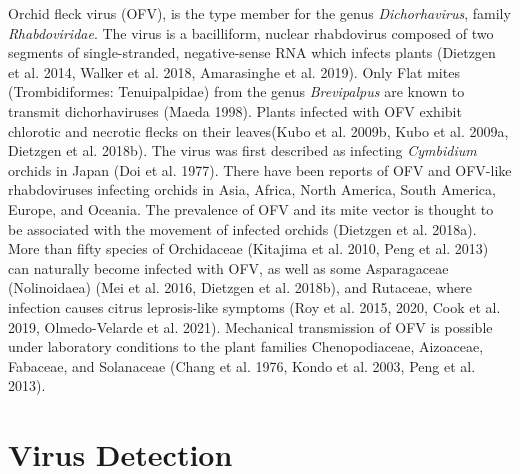 \documentclass[12pt,final,CPage]{ufthesis}
\begin{document}
{  Orchid fleck virus (OFV), is the type member for the genus \emph{Dichorhavirus}, family \emph{Rhabdoviridae}. The virus is a bacilliform, nuclear rhabdovirus composed of two segments of single-stranded, negative-sense RNA which infects plants (Dietzgen et al. 2014, Walker et al. 2018, Amarasinghe et al. 2019). Only Flat mites (Trombidiformes: Tenuipalpidae) from the genus \emph{Brevipalpus} are known to transmit dichorhaviruses (Maeda 1998). Plants infected with OFV exhibit chlorotic and necrotic flecks on their leaves(Kubo et al. 2009b, Kubo et al. 2009a, Dietzgen et al. 2018b). The virus was first described as infecting \emph{Cymbidium} orchids in Japan (Doi et al. 1977). There have been reports of OFV and OFV-like rhabdoviruses infecting orchids in Asia, Africa, North America, South America, Europe, and Oceania. The prevalence of OFV and its mite vector is thought to be associated with the movement of infected orchids (Dietzgen et al. 2018a). More than fifty species of Orchidaceae (Kitajima et al. 2010, Peng et al. 2013) can naturally become infected with OFV, as well as some Asparagaceae (Nolinoidaea) (Mei et al. 2016, Dietzgen et al. 2018b), and Rutaceae, where infection causes citrus leprosis-like symptoms (Roy et al. 2015, 2020, Cook et al. 2019, Olmedo-Velarde et al. 2021). Mechanical transmission of OFV is possible under laboratory conditions to the plant families Chenopodiaceae, Aizoaceae, Fabaceae, and Solanaceae (Chang et al. 1976, Kondo et al. 2003, Peng et al. 2013).

  \hypertarget{virus-detection}{%
  \section{Virus Detection}\label{virus-detection}}

}
\end{document}
